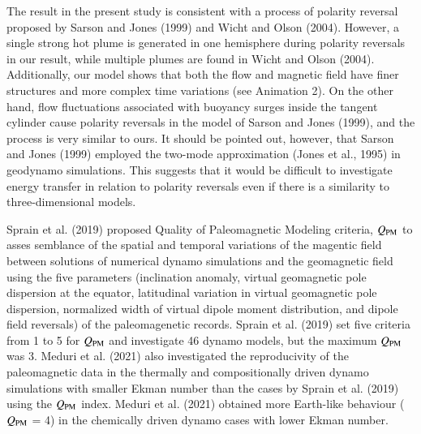 {\color{teal}
The result in the present study is consistent with a process of polarity reversal proposed by Sarson and Jones (1999) and Wicht and Olson (2004).
However, a single strong hot plume is generated in one hemisphere during polarity reversals in our result, while multiple plumes are found in Wicht and Olson (2004).
{\color{red}
Additionally, our model shows that both the flow and magnetic field have finer structures and more complex time variations (see Animation 2).
}
On the other hand, flow fluctuations associated with buoyancy surges inside the tangent cylinder cause polarity reversals in the model of Sarson and Jones (1999), and the process is very similar to ours.
It should be pointed out, however, that Sarson and Jones (1999) employed the two-mode approximation (Jones et al., 1995) in geodynamo simulations.
This suggests that it would be difficult to investigate energy transfer in relation to polarity reversals even if there is a similarity to three-dimensional models.
}


{\color{red}
Sprain et al. (2019) proposed Quality of Paleomagnetic Modeling criteria, $Q_{\rm PM}$ to asses semblance of the spatial and temporal variations of the magentic field between solutions of numerical dynamo simulations and the geomagnetic field using the five parameters (inclination anomaly, virtual geomagnetic pole dispersion at the equator, latitudinal variation in virtual geomagnetic pole dispersion, normalized width of virtual dipole moment distribution, and dipole field reversals) of the paleomagenetic records. Sprain et al. (2019) set five criteria from 1 to 5 for $Q_{\rm PM}$ and investigate 46 dynamo models, but the maximum $Q_{\rm PM}$ was 3. Meduri et al. (2021) also investigated the reproducivity of the paleomagnetic data in the thermally and compositionally driven dynamo simulations with smaller Ekman number than the cases by Sprain et al. (2019) using the $Q_{\rm PM}$ index. Meduri et al. (2021) obtained more Earth-like behaviour ($Q_{\rm PM}$ = 4) in the chemically driven dynamo cases with lower Ekman number.
}


